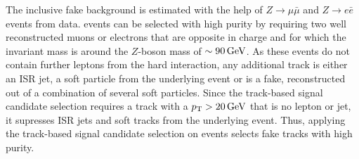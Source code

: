 The inclusive fake background is estimated with the help of $Z\rightarrow\mu\bar{\mu}$ and $Z\rightarrow e\bar{e}$ events from data.
\Zlep events can be selected with high purity by requiring two well reconstructed muons or electrons that are opposite in charge and for which the invariant mass is around the $Z$-boson mass of $\sim90\,\text{Ge}\kern-0.06667em\text{V}$.
As these events do not contain further leptons from the hard interaction, any additional track is either an ISR jet, a soft particle from the underlying event or is a fake, reconstructed out of a combination of several soft particles.
Since the track-based signal candidate selection requires a track with a $p_{\text{T}}>20\,\text{Ge}\kern-0.06667em\text{V}$ that is no lepton or jet, it supresses ISR jets and soft tracks from the underlying event.
Thus, applying the track-based signal candidate selection on \Zlep events selects fake tracks with high purity.


